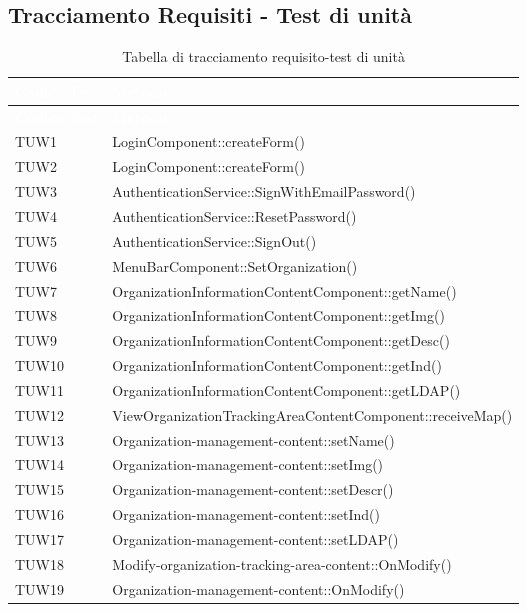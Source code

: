 \subsection{Tracciamento Requisiti - Test di unità}
{
	\renewcommand{\arraystretch}{1.5}
	\centering
	\begin{longtable}{C{2cm} C{8cm}}
		\caption{Tabella di tracciamento requisito-test di unità}\\
		\textcolor{white}{\textbf{Codice Test}} & \textcolor{white}{\textbf{Metodo}}\\	
		\endfirsthead
		\textcolor{white}{\textbf{Codice Test}} & \textcolor{white}{\textbf{Metodo}}\\	
		\endhead
		
		TUW1 & LoginComponent::createForm() \\
		TUW2 & LoginComponent::createForm() \\
		TUW3 & AuthenticationService::SignWithEmailPassword() \\
		TUW4 & AuthenticationService::ResetPassword() \\
		TUW5 & AuthenticationService::SignOut() \\
		TUW6 & MenuBarComponent::SetOrganization() \\
		TUW7 & OrganizationInformationContentComponent::getName() \\
		TUW8 & OrganizationInformationContentComponent::getImg() \\
		TUW9 & OrganizationInformationContentComponent::getDesc() \\
		TUW10 & OrganizationInformationContentComponent::getInd() \\
		TUW11 & OrganizationInformationContentComponent::getLDAP() \\
		TUW12 & ViewOrganizationTrackingAreaContentComponent::receiveMap() \\
		TUW13 & Organization-management-content::setName() \\
		TUW14 & Organization-management-content::setImg() \\
		TUW15 & Organization-management-content::setDescr() \\
		TUW16 & Organization-management-content::setInd() \\
		TUW17 & Organization-management-content::setLDAP() \\
		TUW18 & Modify-organization-tracking-area-content::OnModify() \\
		TUW19 & Organization-management-content::OnModify() \\

\end{longtable}}
